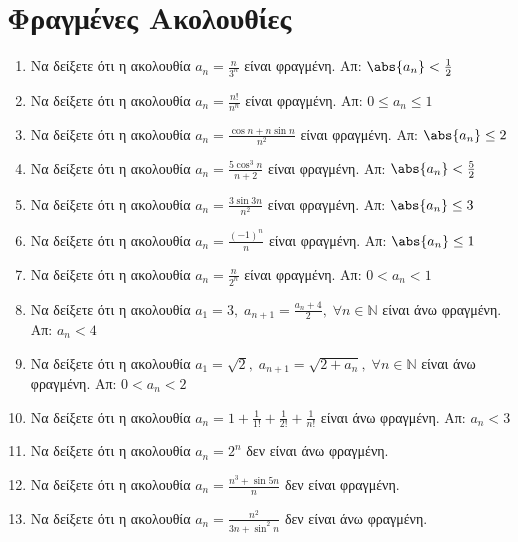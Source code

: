 


\everymath{\displaystyle}



\begin{center}
\end{center}

\vspace{\baselineskip}


\setcounter{chapter}{1}
\section{Φραγμένες Ακολουθίες}

\begin{enumerate}
    \item Να δείξετε ότι η ακολουθία $ a_{n} = \frac{n}{3^{n}} $ είναι 
        φραγμένη. 
        \hfill Απ: $ \abs{a_{n}}< \frac{1}{2} $
    \item Να δείξετε ότι η ακολουθία $ a_{n} = \frac{n!}{n^{n}} $ είναι 
        φραγμένη. 
        \hfill Απ: $ 0 \leq a_{n} \leq 1 $ 
    \item Να δείξετε ότι η ακολουθία $ a_{n} = \frac{\cos{n} + n 
        \sin{n}}{n^{2}} $ είναι φραγμένη. 
        \hfill Απ: $ \abs{a_{n}} \leq 2 $ 
    \item Να δείξετε ότι η ακολουθία $ a_{n} = \frac{5 \cos^{3}{n}}{n+2} $ 
        είναι φραγμένη.
        \hfill Απ: $ \abs{a_{n}} < \frac{5}{2}  $ 
    \item Να δείξετε ότι η ακολουθία $ a_{n} = \frac{3 \sin{3n}}{n^{2}} $ 
        είναι φραγμένη.
        \hfill Απ: $ \abs{a_{n}} \leq 3 $ 
    \item Να δείξετε ότι η ακολουθία $ a_{n} = \frac{(-1)^{n}}{n} $ είναι 
        φραγμένη.
        \hfill Απ: $ \abs{a_{n}} \leq 1 $ 
    \item Να δείξετε ότι η ακολουθία $ a_{n} = \frac{n}{2^{n}}  $ είναι 
        φραγμένη.
        \hfill Απ: $ 0 < a_{n} < 1 $ 
    \item Να δείξετε ότι η ακολουθία $ a_{1} = 3, \; a_{n+1} =
        \frac{a_{n}+4}{2}, \; \forall n \in \mathbb{N} $ είναι άνω φραγμένη.
        \hfill Απ: $ a_{n} < 4 $ 
    \item Να δείξετε ότι η ακολουθία $ a_{1} = \sqrt{2}, \; a_{n+1} =
        \sqrt{2+ a_{n}}, \; \forall n \in \mathbb{N} $ είναι άνω φραγμένη.
        \hfill Απ: $ 0 < a_{n} < 2$ 
    \item Να δείξετε ότι η ακολουθία $ a_{n} = 1 + \frac{1}{1!} +
        \frac{1}{2!} + \frac{1}{n!} $ είναι άνω φραγμένη.
        \hfill Απ: $ a_{n} < 3 $ 
    \item Να δείξετε ότι η ακολουθία $ a_{n} = 2^{n} $ δεν είναι άνω 
        φραγμένη.
    \item Να δείξετε ότι η ακολουθία $ a_{n} = \frac{n^{3} + \sin{5n}}{n} $ δεν είναι 
        φραγμένη.
    \item Να δείξετε ότι η ακολουθία $ a_{n} = \frac{n^{2}}{3n+ \sin^{2}{n}} $ δεν 
        είναι άνω φραγμένη.
\end{enumerate}

